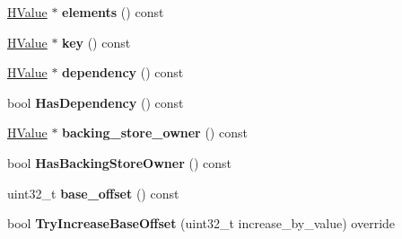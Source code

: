 \begin{DoxyCompactItemize}
\item 
\hyperlink{classv8_1_1internal_1_1_h_value}{H\+Value} $\ast$ {\bfseries elements} () const \hypertarget{classv8_1_1internal_1_1_h_load_keyed_a02de235291a1c02ad1d52a72d6657595}{}\label{classv8_1_1internal_1_1_h_load_keyed_a02de235291a1c02ad1d52a72d6657595}

\item 
\hyperlink{classv8_1_1internal_1_1_h_value}{H\+Value} $\ast$ {\bfseries key} () const \hypertarget{classv8_1_1internal_1_1_h_load_keyed_ac2331fe49a2d5608853937ab40dd680f}{}\label{classv8_1_1internal_1_1_h_load_keyed_ac2331fe49a2d5608853937ab40dd680f}

\item 
\hyperlink{classv8_1_1internal_1_1_h_value}{H\+Value} $\ast$ {\bfseries dependency} () const \hypertarget{classv8_1_1internal_1_1_h_load_keyed_a7dadfc56409430e9a3cf9fd300843887}{}\label{classv8_1_1internal_1_1_h_load_keyed_a7dadfc56409430e9a3cf9fd300843887}

\item 
bool {\bfseries Has\+Dependency} () const \hypertarget{classv8_1_1internal_1_1_h_load_keyed_a7ed430e7c86de542594a0d251b34cea8}{}\label{classv8_1_1internal_1_1_h_load_keyed_a7ed430e7c86de542594a0d251b34cea8}

\item 
\hyperlink{classv8_1_1internal_1_1_h_value}{H\+Value} $\ast$ {\bfseries backing\+\_\+store\+\_\+owner} () const \hypertarget{classv8_1_1internal_1_1_h_load_keyed_a7a9373276c964f5b97dfbc7aada72deb}{}\label{classv8_1_1internal_1_1_h_load_keyed_a7a9373276c964f5b97dfbc7aada72deb}

\item 
bool {\bfseries Has\+Backing\+Store\+Owner} () const \hypertarget{classv8_1_1internal_1_1_h_load_keyed_abf48881c96c536c767a45d71353db5f5}{}\label{classv8_1_1internal_1_1_h_load_keyed_abf48881c96c536c767a45d71353db5f5}

\item 
uint32\+\_\+t {\bfseries base\+\_\+offset} () const \hypertarget{classv8_1_1internal_1_1_h_load_keyed_ab34066782cb823fc19c40cf74e1ca7bf}{}\label{classv8_1_1internal_1_1_h_load_keyed_ab34066782cb823fc19c40cf74e1ca7bf}

\item 
bool {\bfseries Try\+Increase\+Base\+Offset} (uint32\+\_\+t increase\+\_\+by\+\_\+value) override\hypertarget{classv8_1_1internal_1_1_h_load_keyed_af4326dd2c95a9ccff689032de32378d9}{}\label{classv8_1_1internal_1_1_h_load_keyed_af4326dd2c95a9ccff689032de32378d9}


\end{DoxyCompactItemize}
